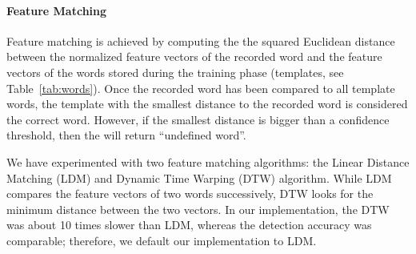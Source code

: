 \paragraph{Feature Matching}
Feature matching is achieved by computing the the squared Euclidean distance between the normalized feature vectors of the recorded word and the feature vectors of the words stored during the training phase (templates, see Table~\ref{tab:words}). 
Once the recorded word has been compared to all template words, the template with the smallest distance to the recorded word is considered the correct word. However, if the smallest distance is bigger than a confidence threshold, then the \cim will return ``undefined word''. 

We have experimented with two feature matching algorithms: the Linear Distance Matching (LDM) and Dynamic Time Warping (DTW) algorithm. While LDM compares the feature vectors of two words successively, DTW looks for the minimum distance between the two vectors. In our implementation, the DTW was about 10 times slower than LDM, whereas the detection accuracy was comparable; therefore, we default our implementation to LDM.
%
%
